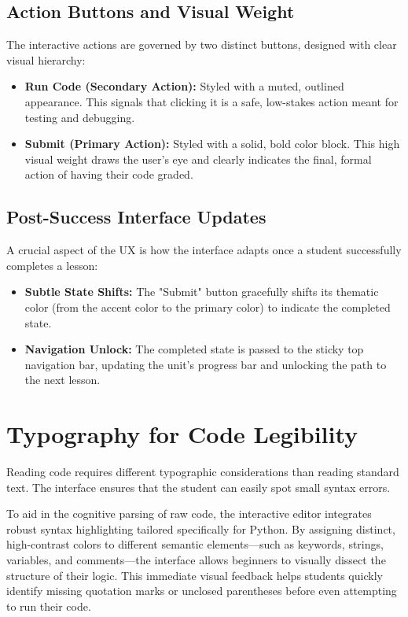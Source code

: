\documentclass[12pt]{report}
\begin{document}
\subsection{Action Buttons and Visual Weight}
The interactive actions are governed by two distinct buttons, designed with clear visual hierarchy:
\begin{itemize}
    \item \textbf{Run Code (Secondary Action):} Styled with a muted, outlined appearance. This signals that clicking it is a safe, low-stakes action meant for testing and debugging.
    \item \textbf{Submit (Primary Action):} Styled with a solid, bold color block. This high visual weight draws the user's eye and clearly indicates the final, formal action of having their code graded.
\end{itemize}

\subsection{Post-Success Interface Updates}
A crucial aspect of the UX is how the interface adapts once a student successfully completes a lesson:
\begin{itemize}
    \item \textbf{Subtle State Shifts:} The "Submit" button gracefully shifts its thematic color (from the accent color to the primary color) to indicate the completed state.
    \item \textbf{Navigation Unlock:} The completed state is passed to the sticky top navigation bar, updating the unit's progress bar and unlocking the path to the next lesson.
\end{itemize}

\section{Typography for Code Legibility}
Reading code requires different typographic considerations than reading standard text. The interface ensures that the student can easily spot small syntax errors.

To aid in the cognitive parsing of raw code, the interactive editor integrates robust syntax highlighting tailored specifically for Python. By assigning distinct, high-contrast colors to different semantic elements—such as keywords, strings, variables, and comments—the interface allows beginners to visually dissect the structure of their logic. This immediate visual feedback helps students quickly identify missing quotation marks or unclosed parentheses before even attempting to run their code.
\end{document}
